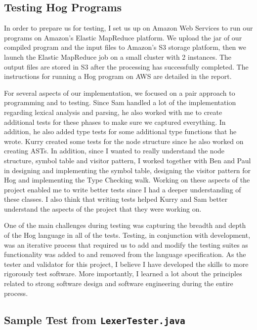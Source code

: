 \documentclass{book}
\begin{document}
\subsection*{Testing Hog Programs}

In order to prepare us for testing, I set us up on Amazon Web Services to run our programs on Amazon’s Elastic MapReduce platform. We upload the jar of our compiled program and the input files to Amazon’s S3 storage platform, then we launch the Elastic MapReduce job on a small cluster with 2 instances. The output files are stored in S3 after the processing has successfully completed. The instructions for running a Hog program on AWS are detailed in the report.

For several aspects of our implementation, we focused on a pair approach to programming and to testing. Since Sam handled a lot of the implementation regarding lexical analysis and parsing, he also worked with me to create additional tests for these phases to make sure we captured everything. In addition, he also added type tests for some additional type functions that he wrote. Kurry created some tests for the node structure since he also worked on creating ASTs. In addition, since I wanted to really understand the node structure, symbol table and visitor pattern, I worked together with Ben and Paul in designing and implementing the symbol table, designing the visitor pattern for Hog and implementing the Type Checking walk. Working on these aspects of the project enabled me to write better tests since I had a deeper understanding of these classes. I also think that writing tests helped Kurry and Sam better understand the aspects of the project that they were working on. 

One of the main challenges during testing was capturing the breadth and depth of the Hog language in all of the tests. Testing, in conjunction with development, was an iterative process that required us to add and modify the testing suites as functionality was added to and removed from the language specification. As the tester and validator for this project, I believe I have developed the skills to more rigorously test software. More importantly, I learned a lot about the principles related to strong software design and software engineering during the entire process. 

\subsection*{Sample Test from \tt LexerTester.java\rm}
\end{document}

